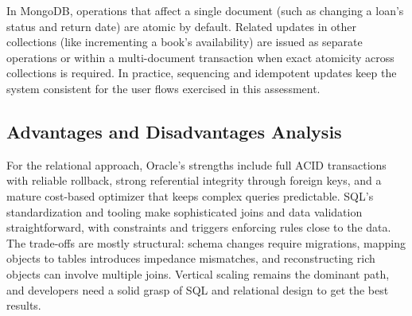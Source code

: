 \documentclass[12pt,a4paper]{article}
\begin{document}
\begin{comment}
\begin{lstlisting}[language=Java, caption=MongoDB Atomic Operations]
@Override
public boolean returnLoan(int loanId) {
    // MongoDB operations are atomic at document level
    Document existingLoan = loans.find(Filters.eq("loan_id", loanId)).first();
    if (existingLoan == null || "RETURNED".equals(existingLoan.getString("status"))) {
        throw new IllegalStateException("Loan not found or already returned");
    }
    
    // Update loan document atomically
    Document update = new Document("status", "RETURNED")
        .append("return_date", formatDate(LocalDate.now()));
    
    boolean updated = loans.updateOne(
        Filters.and(
            Filters.eq("loan_id", loanId),
            Filters.ne("status", "RETURNED")),
        new Document("$set", update)).getModifiedCount() > 0;
    
    if (updated) {
        // Separate atomic operation for book availability
        Loan loan = getLoanById(loanId);
        if (loan != null) {
            books.updateOne(
                Filters.eq("book_id", loan.getBookId()),
                Updates.inc("available_copies", 1));
        }
    }
    return updated;
}
\end{lstlisting}
\end{comment}

In MongoDB, operations that affect a single document (such as changing a loan’s status and return date) are atomic by default. Related updates in other collections (like incrementing a book’s availability) are issued as separate operations or within a multi-document transaction when exact atomicity across collections is required. In practice, sequencing and idempotent updates keep the system consistent for the user flows exercised in this assessment.

\subsection{Advantages and Disadvantages Analysis}

For the relational approach, Oracle’s strengths include full ACID transactions with reliable rollback, strong referential integrity through foreign keys, and a mature cost-based optimizer that keeps complex queries predictable. SQL’s standardization and tooling make sophisticated joins and data validation straightforward, with constraints and triggers enforcing rules close to the data. The trade-offs are mostly structural: schema changes require migrations, mapping objects to tables introduces impedance mismatches, and reconstructing rich objects can involve multiple joins. Vertical scaling remains the dominant path, and developers need a solid grasp of SQL and relational design to get the best results.
\end{document}

